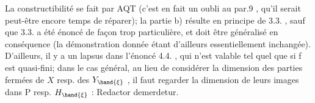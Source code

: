 
La constructibilité se fait par AQT (c'est en fait un oubli au
par.9 , qu'il serait peut-être encore temps de réparer); la partie b)
résulte en principe de 3.3. , sauf que 3.3. a été énoncé de façon trop
particulière, et doit être généralisé en conséquence (la démonstration
donnée étant d'ailleurs essentiellement inchangée). D'ailleurs, il y
a un lapsus dans l'énoncé 4.4. , qui n'est valable tel quel que si f
est quasi-fini; dans le cas général, au lieu de considérer la dimension
des parties fermées de $X$ resp. des $Y_{\hand{\xi}}$ , il faut regarder la dimension
de leurs images dans P resp. $H_{\hand{\xi}}$ : Redactor demerdetur.




